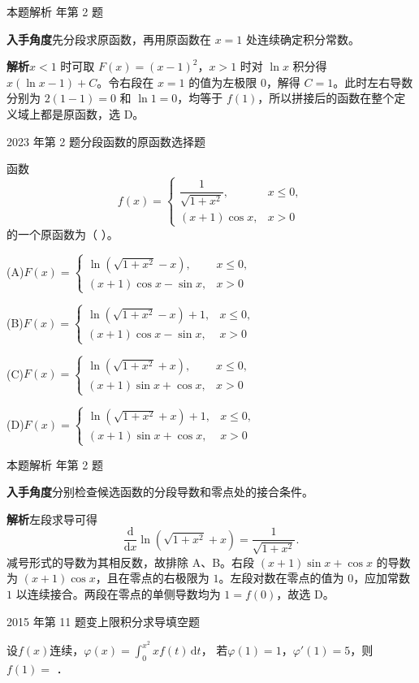 \documentclass[UTF8,zihao=-4,fontset=fandol]{ctexart}
\newcommand{\blank}{\underline{\hspace{5em}}}
\newcommand{\widechoice}[2]{\begin{minipage}[t]{.48\linewidth}\raggedright\textup{(#1)}\enspace #2\end{minipage}}
\newcommand{\twochoices}[4]{%
  \par\medskip\noindent\widechoice{A}{#1}\hfill\widechoice{B}{#2}\par
  \medskip\noindent\widechoice{C}{#3}\hfill\widechoice{D}{#4}\par}
\newcommand{\QuestionPage}[6]{%
  \par\noindent\begin{minipage}{\linewidth}
  \raggedright
  {\small\textcolor{black!60}{#3\quad #5}\hfill\textcolor{accent}{#2}}\par\smallskip}
\newcommand{\QuestionEnd}{\end{minipage}\par\medskip}
\newcommand{\QuestionPage}[6]{%
  \clearpage
  {\small\textcolor{accent}{#1\hfill #2}}\par\medskip
  {\small\textcolor{black!60}{#3\quad #5\hfill #6}}\par\vspace{9bp}}
\newcommand{\QuestionEnd}{}
\newenvironment{QuestionSolution}[1]{%
  \clearpage
  {\small\textcolor{black!60}{本题解析\quad #1}}\par\medskip
}{\par\clearpage}
\begin{document}
\begin{QuestionSolution}{2016 年第 2 题}
\textbf{入手角度}\quad 先分段求原函数，再用原函数在 \(x=1\) 处连续确定积分常数。

\textbf{解析}\quad \(x<1\) 时可取 \(F(x)=(x-1)^2\)，\(x>1\) 时对 \(\ln x\) 积分得 \(x(\ln x-1)+C\)。令右段在 \(x=1\) 的值为左极限 \(0\)，解得 \(C=1\)。此时左右导数分别为 \(2(1-1)=0\) 和 \(\ln1=0\)，均等于 \(f(1)\)，所以拼接后的函数在整个定义域上都是原函数，选 D。
\end{QuestionSolution}

\QuestionPage{3.2 微积分基本公式与基本定理}{选择题}{2023 年第 2 题}{1}{分段函数的原函数}{144 / 234}
函数
\[f(x)=
\begin{cases}
\dfrac{1}{\sqrt{1+x^2}}, & x\le 0,\\[0.6em]
(x+1)\cos x, & x>0
\end{cases}
\]
的一个原函数为（ ）。
\twochoices{\(F(x)=
\begin{cases}
\ln\left(\sqrt{1+x^2}-x\right), & x\le 0,\\
(x+1)\cos x-\sin x, & x>0
\end{cases}
\)}{\(F(x)=
\begin{cases}
\ln\left(\sqrt{1+x^2}-x\right)+1, & x\le 0,\\
(x+1)\cos x-\sin x, & x>0
\end{cases}
\)}{\(F(x)=
\begin{cases}
\ln\left(\sqrt{1+x^2}+x\right), & x\le 0,\\
(x+1)\sin x+\cos x, & x>0
\end{cases}
\)}{\(F(x)=
\begin{cases}
\ln\left(\sqrt{1+x^2}+x\right)+1, & x\le 0,\\
(x+1)\sin x+\cos x, & x>0
\end{cases}
\)}
\QuestionEnd

\begin{QuestionSolution}{2023 年第 2 题}
\textbf{入手角度}\quad 分别检查候选函数的分段导数和零点处的接合条件。

\textbf{解析}\quad 左段求导可得
\[
\frac{\mathrm{d}}{\mathrm{d}x}\ln(\sqrt{1+x^2}+x)
=\frac1{\sqrt{1+x^2}}.
\]
减号形式的导数为其相反数，故排除 A、B。右段 \((x+1)\sin x+\cos x\) 的导数为 \((x+1)\cos x\)，且在零点的右极限为 \(1\)。左段对数在零点的值为 \(0\)，应加常数 \(1\) 以连续接合。两段在零点的单侧导数均为 \(1=f(0)\)，故选 D。
\end{QuestionSolution}

\QuestionPage{3.2 微积分基本公式与基本定理}{填空题}{2015 年第 11 题}{2}{变上限积分求导}{145 / 234}
设$f(x)$连续，$\varphi (x) = \int_0^{x^2} x f(t)\,\mathrm{d} t$，
若$\varphi (1) = 1$，$\varphi'(1) = 5$，则$f(1) =$ \blank{}．
\QuestionEnd
\end{document}
